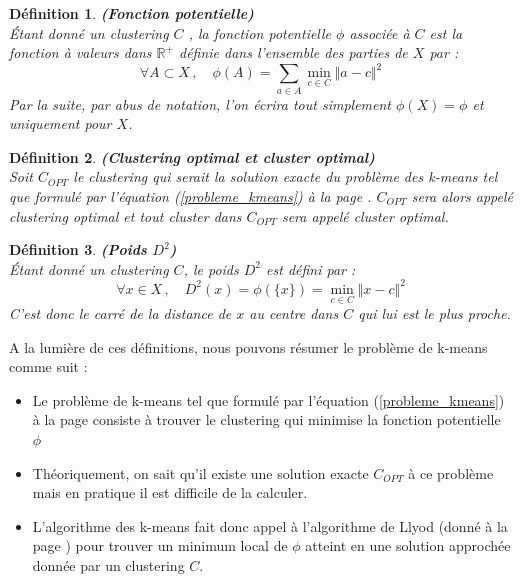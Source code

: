 \documentclass[12pt,a4paper]{book}
\newtheorem{env_definition}{Définition}
\newcommand{\R}{\mathbb{R}}
\newcommand{\1}{\mathds{1}}
\begin{document}
	\begin{env_definition}\label{fonction_potentielle}
		\textbf{(Fonction potentielle)}\\
		Étant donné un clustering $C$ , la fonction potentielle $\phi$ associée à $C$ est la fonction à valeurs dans $\R^+$ définie dans l'ensemble des parties de $X$ par :
		$$
			\forall A \subset X \,, \quad \phi(A) = \sum_{a \in A} \min_{c \in C} \Vert a - c \Vert^2
		$$
		Par la suite, par abus de notation, l'on écrira tout simplement $\phi(X) = \phi$ et uniquement pour $X$.
	\end{env_definition}
	
	\begin{env_definition}\label{clustering_optimal}
		\textbf{(Clustering optimal et cluster optimal)}\\
		Soit $C_{OPT}$ le clustering qui serait la solution exacte du problème des k-means tel que formulé par l'équation (\ref{probleme_kmeans}) à la page \pageref{probleme_kmeans}. $C_{OPT}$ sera alors appelé clustering optimal et tout cluster dans $C_{OPT}$ sera appelé cluster optimal.
	\end{env_definition}
	
	\begin{env_definition}\label{poids_d}
		\textbf{(Poids $D^2$)}\\
		Étant donné un clustering $C$, le poids $D^2$ est défini par :
		$$
			\forall x \in X \,, \quad D^2(x) = \phi(\{x\}) = \min_{c \in C} \Vert x - c \Vert^2
		$$
		C'est donc le carré de la distance de $x$ au centre dans $C$ qui lui est le plus proche.
	\end{env_definition}
	
	A la lumière de ces définitions, nous pouvons résumer le problème de k-means comme suit :
	\begin{itemize}
		\item Le problème de k-means tel que formulé par l'équation (\ref{probleme_kmeans}) à la page \pageref{probleme_kmeans} consiste à trouver le clustering qui minimise la fonction potentielle $\phi$
		\item Théoriquement, on sait qu'il existe une solution exacte $C_{OPT}$ à ce problème mais en pratique il est difficile de la calculer.
		\item L'algorithme des k-means fait donc appel à l'algorithme de Llyod (donné à la page \pageref{algo_lloyd}) pour trouver un minimum local de $\phi$ atteint en une solution approchée donnée par un clustering $C$. \\
	\end{itemize}
\end{document}
